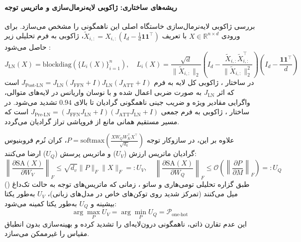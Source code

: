 \paragraph*{ریشه‌های ساختاری: ژاکوبی لایه‌نرمال‌سازی و ماتریس توجه}
بررسی ژاکوبی لایه‌نرمال‌سازی خاستگاه اصلی این ناهمگونی را مشخص می‌سازد. برای ورودی $X \in \mathbb{R}^{n \times d}$ با تعریف $\tilde{X}_{i,:} = X_{i,:}(I_d - \frac{1}{d}\mathbf{1}\mathbf{1}^\top)$، ژاکوبی به فرم تحلیلی زیر حاصل می‌شود \cite{tomihari2026understanding}:
\begin{equation}
    J_{\text{LN}}(X) = \text{blockdiag}\left(\{L_i(X)\}_{i=1}^n\right), \quad L_i(X) = \frac{\sqrt{d}}{\|\tilde{X}_{i,:}\|_2} \left( I_d - \frac{\tilde{X}_{i,:}\tilde{X}_{i,:}^\top}{\|\tilde{X}_{i,:}\|_2^2} \right) \left( I_d - \frac{\mathbf{1}\mathbf{1}^\top}{d} \right)
\end{equation}
در ساختار ، ژاکوبی کل لایه به فرم $J_{\text{Post-LN}} = J_{\text{LN}} (J_{\text{FFN}} + I) J_{\text{LN}} (J_{\text{ATT}} + I)$ است که اثر $J_{\text{LN}}$ به صورت ضربی اعمال شده و با نوسان واریانس در لایه‌های متوالی، واگرایی مقادیر ویژه و ضریب جینی ناهمگونی گرادیان تا بالای $0.94$ تشدید می‌شود. در ساختار ، ژاکوبی به فرم جمعی $J_{\text{Pre-LN}} = (J_{\text{FFN}}J_{\text{LN}} + I)(J_{\text{ATT}}J_{\text{LN}} + I)$ است که مسیر مستقیم همانی مانع از فروپاشی تراز گرادیان می‌گردد.

علاوه بر این، در سازوکار توجه $P = \text{softmax}\left(\frac{X W_Q W_K^\top X^\top}{\sqrt{d_k}}\right)$، کران نُرم فروبنیوس گرادیان ماتریس ارزش ($U_V$) و ماتریس پرسش ($U_Q$) ارضا می‌کنند:
\begin{equation}
    \left\|\frac{\partial \text{SA}(X)}{\partial W_V}\right\|_F \le \sqrt{d_v} \|P\|_F \|X\|_F =: U_V, \quad \left\|\frac{\partial \text{SA}(X)}{\partial W_Q}\right\|_F \le \mathcal{O}\left(\left\|\frac{\partial P}{\partial M}\right\|_F\right) =: U_Q
\end{equation}
طبق گزاره تحلیلی تومی‌هاری و ساتو \cite{tomihari2026understanding}، زمانی که ماتریس‌های توجه به حالت تک‌داغ () میل می‌کنند (تمرکز شدید روی توکن‌های خاص در مدل‌های زبانی)، $U_V$ به‌طور یکتا بیشینه و $U_Q$ به‌طور یکتا کمینه می‌شود:
\begin{equation}
    \arg\max_P U_V = \arg\min_P U_Q = \mathcal{P}_{\text{one-hot}}
\end{equation}
این عدم تقارن ذاتی، ناهمگونی درون‌لایه‌ای را تشدید کرده و بهینه‌سازی بدون انطباق مقیاس را غیرممکن می‌سازد.

